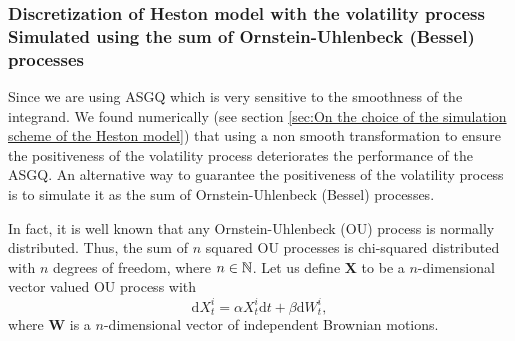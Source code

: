 \subsubsection{Discretization of Heston model with the volatility process Simulated using the sum of  Ornstein-Uhlenbeck (Bessel) processes}\label{sec:Discretization of Heston model with the volatility process Simulated using the sum of  Ornstein-Uhlenbeck (Bessel) processes}

Since we are using ASGQ which is very sensitive to the smoothness of the integrand. We found numerically (see section \ref{sec:On the choice of the simulation scheme of the Heston model}) that using a non smooth transformation to ensure the positiveness of the volatility process deteriorates the performance of the ASGQ. An alternative way to guarantee the positiveness of the volatility process is to simulate it as  the sum of  Ornstein-Uhlenbeck (Bessel) processes.

In fact, it is well known that any Ornstein-Uhlenbeck (OU) process is normally distributed. Thus, the sum of $n$ squared OU processes is chi-squared distributed with $n$ degrees of freedom, where $n \in \mathbb{N}$. Let us define $\mathbf{X}$ to be a $n$-dimensional vector valued OU process with
\begin{equation}\label{equivalent OU process} 
\mathrm{d}X_t^i = \alpha X_t^i \mathrm{d}t + \beta \mathrm{d}W_t^i,
\end{equation}
where $\mathbf{W}$ is a $n$-dimensional vector of independent Brownian motions. 

